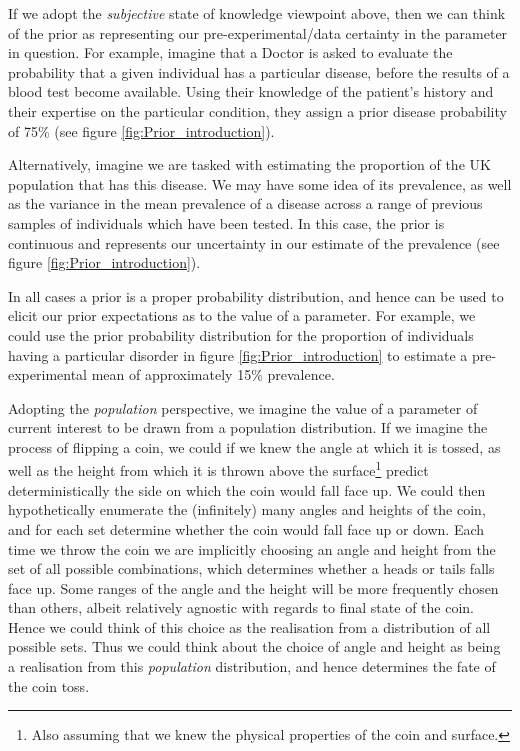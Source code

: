 \documentclass[11pt,fullpage]{book}
\begin{document}
If we adopt the \textit{subjective} state of knowledge viewpoint above, then we can think of the prior as representing our pre-experimental/data certainty in the parameter in question. For example, imagine that a Doctor is asked to evaluate the probability that a given individual has a particular disease, before the results of a blood test become available. Using their knowledge of the patient's history and their expertise on the particular condition, they assign a prior disease probability of 75\% (see figure \ref{fig:Prior_introduction}). 

Alternatively, imagine we are tasked with estimating the proportion of the UK population that has this disease. We may have some idea of its prevalence, as well as the variance in the mean prevalence of a disease across a range of previous samples of individuals which have been tested. In this case, the prior is continuous and represents our uncertainty in our estimate of the prevalence (see figure \ref{fig:Prior_introduction}). 

In all cases a prior is a proper probability distribution, and hence can be used to elicit our prior expectations as to the value of a parameter. For example, we could use the prior probability distribution for the proportion of individuals having a particular disorder in figure \ref{fig:Prior_introduction} to estimate a pre-experimental mean of approximately 15\% prevalence. 

Adopting the \textit{population} perspective, we imagine the value of a parameter of current interest to be drawn from a population distribution. If we imagine the process of flipping a coin, we could if we knew the angle at which it is tossed, as well as the height from which it is thrown above the surface\footnote{Also assuming that we knew the physical properties of the coin and surface.} predict deterministically the side on which the coin would fall face up. We could then hypothetically enumerate the (infinitely) many angles and heights of the coin, and for each set determine whether the coin would fall face up or down. Each time we throw the coin we are implicitly choosing an angle and height from the set of all possible combinations, which determines whether a heads or tails falls face up. Some ranges of the angle and the height will be more frequently chosen than others, albeit relatively agnostic with regards to final state of the coin.  Hence we could think of this choice as the realisation from a distribution of all possible sets. Thus we could think about the choice of angle and height as being a realisation from this \textit{population} distribution, and hence determines the fate of the coin toss.
\end{document}
